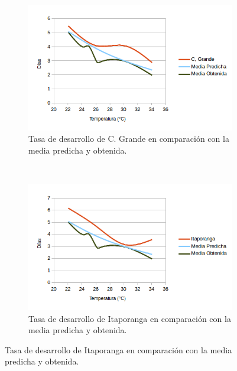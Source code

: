 \begin{figure}[!htbp]
\begin{subfigure}[b]{0.45\textwidth}
    \end{subfigure}
    \begin{subfigure}[b]{0.45\textwidth}
            \includegraphics[width=\textwidth]{capitulo-6/graphics/desarrollo-huevos-3.png}
            \caption{Tasa de desarrollo de C. Grande en comparación con la media predicha y obtenida.}
    \end{subfigure}
    ~~~~
    \begin{subfigure}[b]{0.45\textwidth}
            \includegraphics[width=\textwidth]{capitulo-6/graphics/desarrollo-huevos-4.png}
            \caption{Tasa de desarrollo de Itaporanga en comparación con la media predicha y obtenida.}


\end{subfigure}
\end{figure}
